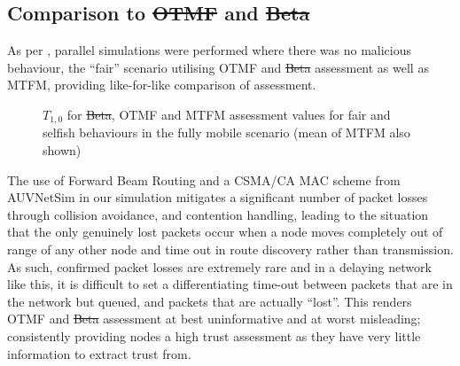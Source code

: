 \documentclass[conference]{IEEEtran}
\providecommand{\DIFadd}[1]{{\protect\color{blue}\uwave{#1}}} %
\providecommand{\DIFdel}[1]{{\protect\color{red}\sout{#1}}}                      %
\providecommand{\DIFaddbegin}{} %
\providecommand{\DIFaddend}{} %
\providecommand{\DIFdelbegin}{} %
\providecommand{\DIFdelend}{} %
\providecommand{\DIFaddFL}[1]{\DIFadd{#1}} %
\providecommand{\DIFdelFL}[1]{\DIFdel{#1}} %
\providecommand{\DIFaddbeginFL}{} %
\providecommand{\DIFaddendFL}{} %
\providecommand{\DIFdelbeginFL}{} %
\providecommand{\DIFdelendFL}{} %
\begin{document}
\subsection{Comparison to \DIFdelbegin \DIFdel{OTMF }\DIFdelend \DIFaddbegin \DIFadd{Hermes }\DIFaddend and \DIFdelbegin \DIFdel{Beta}\DIFdelend \DIFaddbegin \DIFadd{OTFM}\DIFaddend }
As per \cite{Guo11}, parallel simulations were performed where there was no malicious behaviour, the ``fair'' scenario utilising OTMF and \DIFdelbegin \DIFdel{Beta }\DIFdelend \DIFaddbegin \DIFadd{Hermes }\DIFaddend assessment as well as MTFM, providing like-for-like comparison of assessment.
%
\begin{figure}[h]
\caption{$T_{1,0}$ for \DIFdelbeginFL \DIFdelFL{Beta}\DIFdelendFL \DIFaddbeginFL \DIFaddFL{Hermes}\DIFaddendFL , OTMF and MTFM assessment values for fair and selfish behaviours in the fully mobile scenario (mean of MTFM also shown)}
\label{fig:otmf_beta_comparison}
\end{figure}
%
The use of Forward Beam Routing and a CSMA/CA MAC scheme from AUVNetSim\cite{Miquel2008} in our simulation mitigates a significant number of packet losses through collision avoidance, and contention handling, leading to the situation that the only genuinely lost packets occur when a node moves completely out of range of any other node and time out in route discovery rather than transmission.
As such, confirmed packet losses are extremely rare and in a delaying network like this, it is difficult to set a differentiating time-out between packets that are in the network but queued, and packets that are actually ``lost''.
This renders OTMF and \DIFdelbegin \DIFdel{Beta }\DIFdelend \DIFaddbegin \DIFadd{Hermes }\DIFaddend assessment at best uninformative and at worst misleading; consistently providing nodes a high trust assessment as they have very little information to extract trust from. 
\end{document}

